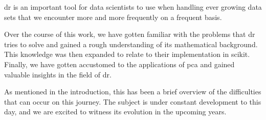 \Acrlong{dr} is an important tool for data scientists to use when handling ever growing data sets that we encounter more and more frequently on a frequent basis.
\bigskip


Over the course of this work, we have gotten familiar with the problems that \gls{dr} tries to solve and gained a rough understanding of its mathematical background.
This knowledge was then expanded to relate to their implementation in \gls{scikit}.
Finally, we have gotten accustomed to the applications of \gls{pca} and gained valuable insights in the field of \acrlong{dr}.
\bigskip


As mentioned in the introduction, this has been a brief overview of the difficulties that can occur on this journey.
The subject is under constant development to this day, and we are excited to witness its evolution in the upcoming years.

